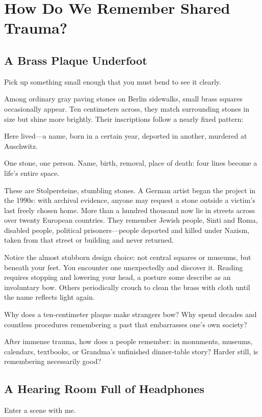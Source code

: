 \chapter[Remembering Shared Trauma]{How Do We Remember Shared Trauma?}
\section{A Brass Plaque Underfoot}
Pick up something small enough that you must bend to see it clearly.

Among ordinary gray paving stones on Berlin sidewalks, small brass squares occasionally appear. Ten centimeters across, they match surrounding stones in size but shine more brightly. Their inscriptions follow a nearly fixed pattern:

Here lived---a name, born in a certain year, deported in another, murdered at Auschwitz.

One stone, one person. Name, birth, removal, place of death: four lines become a life's entire space.

These are Stolpersteine, stumbling stones. A German artist began the project in the 1990s: with archival evidence, anyone may request a stone outside a victim's last freely chosen home. More than a hundred thousand now lie in streets across over twenty European countries. They remember Jewish people, Sinti and Roma, disabled people, political prisoners---people deported and killed under Nazism, taken from that street or building and never returned.

Notice the almost stubborn design choice: not central squares or museums, but beneath your feet. You encounter one unexpectedly and discover it. Reading requires stopping and lowering your head, a posture some describe as an involuntary bow. Others periodically crouch to clean the brass with cloth until the name reflects light again.

Why does a ten-centimeter plaque make strangers bow? Why spend decades and countless procedures remembering a past that embarrasses one's own society?

After immense trauma, how does a people remember: in monuments, museums, calendars, textbooks, or Grandma's unfinished dinner-table story? Harder still, is remembering necessarily good?

\section{A Hearing Room Full of Headphones}
Enter a scene with me.

